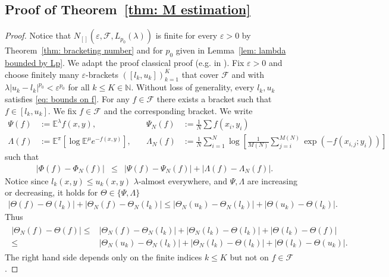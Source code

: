 \documentclass{amsart}
\theoremstyle{definition}
\newcommand{\E}{{\mathbb E}}
\newcommand{\Natural}{\mathbb{N}}
\newcommand{\F}{\mathcal{F}}
\begin{document}
\subsection*{Proof of Theorem~\ref{thm: M estimation}}
\begin{proof}
    Notice that $N_{[]}(\varepsilon, \F, L_{p_0}(\lambda))$ is finite for every $\varepsilon >0$ by Theorem~\ref{thm: bracketing number} and for $p_0$ given in Lemma~\ref{lem: lambda bounded by Lp}.
    We adapt the proof classical proof (e.g. in \cite[Theorem 3.2]{sen2022lecture}).
Fix $\varepsilon >0$ and choose finitely many $\varepsilon$-brackets $([l_k, u_k])_{k = 1}^K$ that cover $\F$ and with $\lambda|u_k - l_k|^{p_0} < \varepsilon^{p_0}$ for all $k \le K \in \Natural$. Without loss of generality, every $l_k, u_k$ satisfies \eqref{eq: bounds on f}. For any $f \in \F$ there exists a bracket such that $f \in [l_k, u_k]$. We fix $f\in \F$ and the corresponding bracket. 
    We write
    \begin{align*}
        \Psi(f) &:=\E^\lambda f(x, y), &\quad \Psi_N(f) &:= \frac{1}{N} \sum f(x_i, y_i) \\
        \Lambda(f) &:= \E^\pi \left[ \log \E^\mu e^{-f(x, y)} \right], &\quad \Lambda_N(f) &:= \frac{1}{N}\sum_{i = 1}^{N} \log \left[ \frac{1}{M(N)}\sum_{j = i}^{M(N)}  \exp \left( -f(x_{i, j}; y_i) \right) \right]
    \end{align*}
    such that  
    \begin{eqnarray*}
        |\Phi(f) - \Phi_N(f)| &\le& |\Psi(f) - \Psi_N(f)| + |\Lambda(f) - \Lambda_N(f) |.
    \end{eqnarray*}
     Notice since $l_k(x, y)\le u_k(x,y)$ $\lambda$-almost everywhere, and $\Psi, \Lambda$ are increasing or decreasing, it holds for $\Theta \in \{ \Psi, \Lambda\}$
     \begin{eqnarray*}
         |\Theta(f) - \Theta(l_k)| + |\Theta_N(f) - \Theta_N(l_k)| \le |\Theta_N(u_k) - \Theta_N(l_k)| + |\Theta(u_k) - \Theta(l_k)| .
     \end{eqnarray*}
     Thus 
      \begin{align}
      \begin{aligned}\label{eq: unif for f bounds}
        |\Theta_N(f) - \Theta(f)| \le& |\Theta_N(f) -\Theta_N(l_k)| +  |\Theta_N(l_k) - \Theta(l_k)| + |\Theta(l_k) - \Theta(f)| \\
         \le & |\Theta_N(u_k) - \Theta_N(l_k)| +  |\Theta_N(l_k) - \Theta(l_k)| + |\Theta(l_k) - \Theta(u_k)|.
      \end{aligned}
      \end{align}
    The right hand side depends only on the finite indices $k \le K$ but not on $f \in \F$.


\end{proof}
\end{document}
